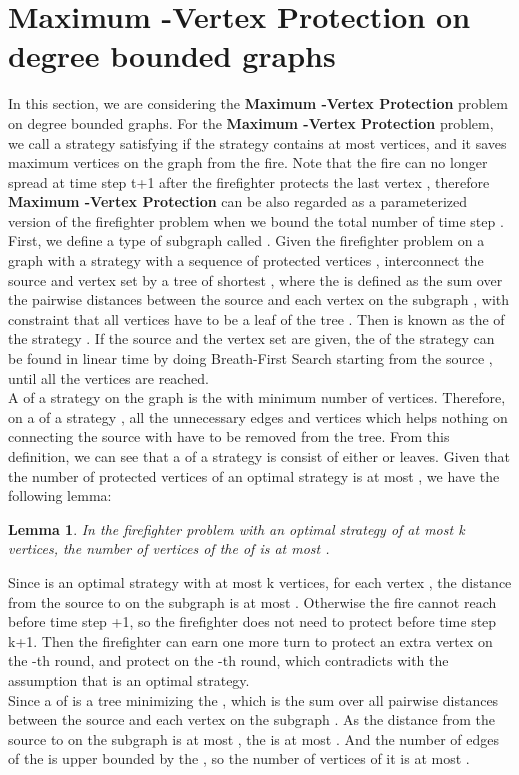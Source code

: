 \documentclass[11pt,letter]{article}
\newtheorem{Lem}[Thm]{Lemma}
\newenvironment{proof}{\noindent {\textbf{Proof }}}{ \medskip}
\begin{document}
\section{Maximum -Vertex Protection on degree bounded graphs}

In this section, we are considering the \textbf{Maximum -Vertex Protection} problem on degree bounded graphs. For the \textbf{Maximum -Vertex Protection} problem, we call a strategy  satisfying if the strategy  contains at most  vertices, and it saves maximum vertices on the graph  from the fire. Note that the fire can no longer spread at time step t+1 after the firefighter protects the last vertex , therefore \textbf{Maximum -Vertex Protection} can be also regarded as a parameterized version of the firefighter problem when we bound the total number of time step . \\

First, we define a type of subgraph called . Given the firefighter problem on a graph  with a strategy  with a sequence of protected vertices , interconnect the source  and vertex set  by a tree  of shortest , where the  is defined as the sum over the pairwise distances between the source  and each vertex  on the subgraph , with constraint that all vertices  have to be a leaf of the tree . Then  is known as the  of the strategy . If the source  and the vertex set  are given, the  of the strategy  can be found in linear time by doing Breath-First Search starting from the source , until all the vertices  are reached.\\

A  of a strategy  on the graph  is the  with minimum number of vertices. Therefore, on a  of a strategy , all the unnecessary edges and vertices which helps nothing on connecting the source  with  have to be removed from the tree. From this definition, we can see that a  of a strategy  is consist of either  or  leaves. Given that the number of protected vertices of an optimal strategy  is at most , we have the following lemma:

\begin{Lem}
In the firefighter problem with an optimal strategy  of at most k vertices, the number of vertices of the  of  is at most .
\end{Lem}

\begin{proof}
Since  is an optimal strategy with at most k vertices, for each vertex , the distance from the source  to  on the subgraph  is at most . Otherwise the fire cannot reach  before time step +1, so the firefighter does not need to protect  before time step k+1. Then the firefighter can earn one more turn to protect an extra vertex  on the -th round, and protect  on the -th round, which contradicts with the assumption that  is an optimal strategy.\\

Since a  of  is a tree minimizing the , which is the sum over all pairwise distances between the source  and each vertex  on the subgraph . As the distance from the source  to  on the subgraph  is at most , the  is at most . And the number of edges of the  is upper bounded by the , so the number of vertices of it is at most .
\end{proof}
\end{document}
